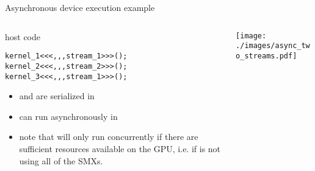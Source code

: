 \begin{frame}[fragile]{Asynchronous device execution example}
    \begin{columns}[T]
        \begin{column}{0.45\textwidth}
            \begin{codecolumn}{host code}
                \begin{lstlisting}[style=boxcudatiny]
kernel_1<<<,,,stream_1>>>();
kernel_2<<<,,,stream_2>>>();
kernel_3<<<,,,stream_1>>>();
                \end{lstlisting}
            \end{codecolumn}
            \begin{itemize}
                \item \footnotesize {} and  are serialized in 
                \item {} can run asynchronously in 
                \item note that  will only run concurrently if there are sufficient resources available on the GPU, i.e. if  is not using all of the SMXs.
            \end{itemize}
        \end{column}
        \begin{column}{0.6\textwidth}
            \texttt{[image: ./images/async\_two\_streams.pdf]}
        \end{column}
    \end{columns}
\end{frame}

